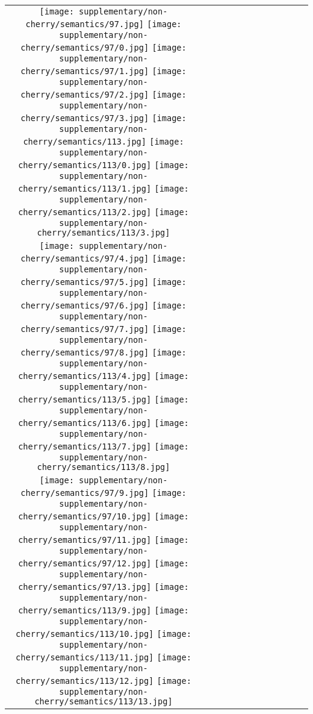 \begin{figure*}[tb!]
    \centering
    \setlength{\tabcolsep}{0.5pt}
    {\small
    \renewcommand{\arraystretch}{0.5} 
    \begin{tabular}{c c c c c c c c c c c c }
    \captionsetup{type=figure, font=scriptsize}
  \texttt{[image: supplementary/non-cherry/semantics/97.jpg]}
  \texttt{[image: supplementary/non-cherry/semantics/97/0.jpg]}
  \texttt{[image: supplementary/non-cherry/semantics/97/1.jpg]}
  \texttt{[image: supplementary/non-cherry/semantics/97/2.jpg]}
  \texttt{[image: supplementary/non-cherry/semantics/97/3.jpg]}
    \hspace{5mm}
      \texttt{[image: supplementary/non-cherry/semantics/113.jpg]}
  \texttt{[image: supplementary/non-cherry/semantics/113/0.jpg]}
  \texttt{[image: supplementary/non-cherry/semantics/113/1.jpg]}
  \texttt{[image: supplementary/non-cherry/semantics/113/2.jpg]}
  \texttt{[image: supplementary/non-cherry/semantics/113/3.jpg]}

 \tabularnewline
  \texttt{[image: supplementary/non-cherry/semantics/97/4.jpg]}
  \texttt{[image: supplementary/non-cherry/semantics/97/5.jpg]}
  \texttt{[image: supplementary/non-cherry/semantics/97/6.jpg]}
  \texttt{[image: supplementary/non-cherry/semantics/97/7.jpg]}
  \texttt{[image: supplementary/non-cherry/semantics/97/8.jpg]}
    \hspace{5mm}
  \texttt{[image: supplementary/non-cherry/semantics/113/4.jpg]}
  \texttt{[image: supplementary/non-cherry/semantics/113/5.jpg]}
  \texttt{[image: supplementary/non-cherry/semantics/113/6.jpg]}
  \texttt{[image: supplementary/non-cherry/semantics/113/7.jpg]}
  \texttt{[image: supplementary/non-cherry/semantics/113/8.jpg]}
\tabularnewline
  \texttt{[image: supplementary/non-cherry/semantics/97/9.jpg]}
  \texttt{[image: supplementary/non-cherry/semantics/97/10.jpg]}
  \texttt{[image: supplementary/non-cherry/semantics/97/11.jpg]}
  \texttt{[image: supplementary/non-cherry/semantics/97/12.jpg]}
  \texttt{[image: supplementary/non-cherry/semantics/97/13.jpg]}
    \hspace{5mm}
  \texttt{[image: supplementary/non-cherry/semantics/113/9.jpg]}
  \texttt{[image: supplementary/non-cherry/semantics/113/10.jpg]}
  \texttt{[image: supplementary/non-cherry/semantics/113/11.jpg]}
  \texttt{[image: supplementary/non-cherry/semantics/113/12.jpg]}
  \texttt{[image: supplementary/non-cherry/semantics/113/13.jpg]}


\end{tabular}}
\end{figure*}
